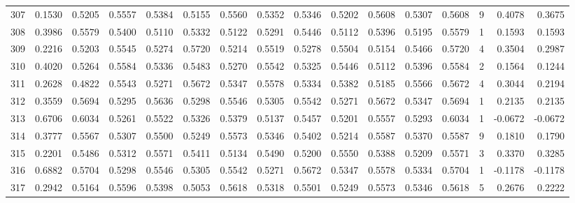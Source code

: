 \begin{tabular}{lrrrrrrrrrrrrrrr}
307 &      0.1530 &  0.5205 &  0.5557 &  0.5384 &  0.5155 &  0.5560 &  0.5352 &  0.5346 &  0.5202 &  0.5608 &   0.5307 &     0.5608 &      9 &                    0.4078 &                     0.3675 \\
308 &      0.3986 &  0.5579 &  0.5400 &  0.5110 &  0.5332 &  0.5122 &  0.5291 &  0.5446 &  0.5112 &  0.5396 &   0.5195 &     0.5579 &      1 &                    0.1593 &                     0.1593 \\
309 &      0.2216 &  0.5203 &  0.5545 &  0.5274 &  0.5720 &  0.5214 &  0.5519 &  0.5278 &  0.5504 &  0.5154 &   0.5466 &     0.5720 &      4 &                    0.3504 &                     0.2987 \\
310 &      0.4020 &  0.5264 &  0.5584 &  0.5336 &  0.5483 &  0.5270 &  0.5542 &  0.5325 &  0.5446 &  0.5112 &   0.5396 &     0.5584 &      2 &                    0.1564 &                     0.1244 \\
311 &      0.2628 &  0.4822 &  0.5543 &  0.5271 &  0.5672 &  0.5347 &  0.5578 &  0.5334 &  0.5382 &  0.5185 &   0.5566 &     0.5672 &      4 &                    0.3044 &                     0.2194 \\
312 &      0.3559 &  0.5694 &  0.5295 &  0.5636 &  0.5298 &  0.5546 &  0.5305 &  0.5542 &  0.5271 &  0.5672 &   0.5347 &     0.5694 &      1 &                    0.2135 &                     0.2135 \\
313 &      0.6706 &  0.6034 &  0.5261 &  0.5522 &  0.5326 &  0.5379 &  0.5137 &  0.5457 &  0.5201 &  0.5557 &   0.5293 &     0.6034 &      1 &                   -0.0672 &                    -0.0672 \\
314 &      0.3777 &  0.5567 &  0.5307 &  0.5500 &  0.5249 &  0.5573 &  0.5346 &  0.5402 &  0.5214 &  0.5587 &   0.5370 &     0.5587 &      9 &                    0.1810 &                     0.1790 \\
315 &      0.2201 &  0.5486 &  0.5312 &  0.5571 &  0.5411 &  0.5134 &  0.5490 &  0.5200 &  0.5550 &  0.5388 &   0.5209 &     0.5571 &      3 &                    0.3370 &                     0.3285 \\
316 &      0.6882 &  0.5704 &  0.5298 &  0.5546 &  0.5305 &  0.5542 &  0.5271 &  0.5672 &  0.5347 &  0.5578 &   0.5334 &     0.5704 &      1 &                   -0.1178 &                    -0.1178 \\
317 &      0.2942 &  0.5164 &  0.5596 &  0.5398 &  0.5053 &  0.5618 &  0.5318 &  0.5501 &  0.5249 &  0.5573 &   0.5346 &     0.5618 &      5 &                    0.2676 &                     0.2222 \\

\end{tabular}
